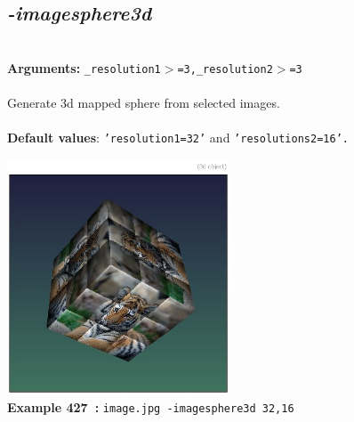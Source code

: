 \documentclass[a4paper,11pt,twoside]{book}
\begin{document}
\subsection{\emph{-imagesphere3d} }\vspace*{-0.5em}
~\\\textbf{Arguments: } 
{\small \texttt{\_resolution1$>$=3,\_resolution2$>$=3}}\\~\\
Generate 3d mapped sphere from selected images.
~\\~\\\textbf{Default values}: {\small \texttt{'resolution1=32'} and \texttt{'resolutions2=16'.}}
\begin{center}\includegraphics[keepaspectratio=true,height=7cm,width=\textwidth]{img/gmic_def427.jpg}\\
{\footnotesize \textbf{Example 427~:} \texttt{image.jpg -imagesphere3d 32,16}}
\end{center}
\end{document}

